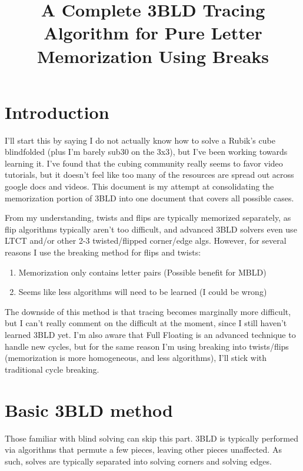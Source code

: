\documentclass{article}
\begin{document}
\title{A Complete 3BLD Tracing Algorithm for Pure Letter Memorization Using Breaks}
\date{}

\maketitle

\section{Introduction}

I'll start this by saying I do not actually know how to solve a Rubik's cube blindfolded (plus I'm barely sub30 on the 3x3), but I've been working towards learning it. I've found that the cubing community really seems to favor video tutorials, but it doesn't feel like too many of the resources are spread out across google docs and videos. This document is my attempt at consolidating the memorization portion of 3BLD into one document that covers all possible cases.

From my understanding, twists and flips are typically memorized separately, as flip algorithms typically aren't too difficult, and advanced 3BLD solvers even use LTCT and/or other 2-3 twisted/flipped corner/edge algs. However, for several reasons I use the breaking method for flips and twists:
\begin{enumerate}
    \item Memorization only contains letter pairs (Possible benefit for MBLD)
    \item Seems like less algorithms will need to be learned (I could be wrong)
\end{enumerate}
The downside of this method is that tracing becomes marginally more difficult, but I can't really comment on the difficult at the moment, since I still haven't learned 3BLD yet. I'm also aware that Full Floating is an advanced technique to handle new cycles, but for the same reason I'm using breaking into twists/flips (memorization is more homogeneous, and less algorithms), I'll stick with traditional cycle breaking.

\section{Basic 3BLD method}

Those familiar with blind solving can skip this part. 3BLD is typically performed via algorithms that permute a few pieces, leaving other pieces unaffected. As such, solves are typically separated into solving corners and solving edges. 
\end{document}
